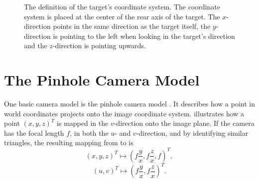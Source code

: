 \begin{figure}[!ht]
    \centering
    \hspace*{2cm}
    \caption{\label{fig:targetcoordsystem} The definition of the target's coordinate system. The coordinate system is placed at the center of the rear axis of the target. The $x$-direction points in the same direction as the target itself, the $y$-direction is pointing to the left when looking in the target's direction and the $z$-direction is pointing upwards.}
\end{figure}

\section{The Pinhole Camera Model}
One basic camera model is the pinhole camera model \cite{Hartley:2004}.
It describes how a point in world coordinates projects onto the image coordinate system.
 illustrates how a point $(x, y, z)^T$ is mapped in the $v$-direction onto the image plane.
If the camera has the focal length $f$, in both the $u$- and $v$-direction, and by identifying similar triangles, the resulting mapping from  to  is
\begin{equation*}
    (x, y, z)^T \mapsto \left(f\frac{y}{x}, f\frac{z}{x}, f\right)^T,
\end{equation*}
\ie
\begin{equation*}
    (u, v)^T \mapsto \left(f\frac{y}{x}, f\frac{z}{x}\right)^T.
\end{equation*}

